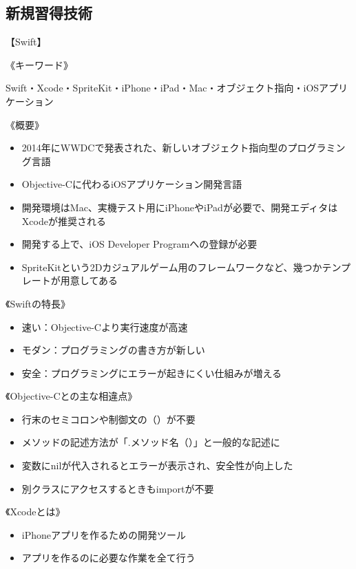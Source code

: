 \documentclass[openany,11pt,papersize]{jsbook}
\begin{document}
\begin{appendix}

\chapter{新規習得技術}
\par【Swift】
\par《キーワード》
\par Swift・Xcode・SpriteKit・iPhone・iPad・Mac・オブジェクト指向・iOSアプリケーション
\par《概要》
\begin{itemize}
\item 2014年にWWDCで発表された、新しいオブジェクト指向型のプログラミング言語
\item Objective-Cに代わるiOSアプリケーション開発言語
\item 開発環境はMac、実機テスト用にiPhoneやiPadが必要で、開発エディタはXcodeが推奨される
\item 開発する上で、iOS Developer Programへの登録が必要
\item SpriteKitという2Dカジュアルゲーム用のフレームワークなど、幾つかテンプレートが用意してある
\end{itemize}
\par《Swiftの特長》
\begin{itemize}
\item 速い：Objective-Cより実行速度が高速
\item モダン：プログラミングの書き方が新しい
\item 安全：プログラミングにエラーが起きにくい仕組みが増える
\end{itemize}
\par《Objective-Cとの主な相違点》
\begin{itemize}
\item 行末のセミコロンや制御文の（）が不要
\item メソッドの記述方法が「.メソッド名（）」と一般的な記述に
\item 変数にnilが代入されるとエラーが表示され、安全性が向上した
\item 別クラスにアクセスするときもimportが不要
\end{itemize}
\par《Xcodeとは》
\begin{itemize}
\item iPhoneアプリを作るための開発ツール
\item アプリを作るのに必要な作業を全て行う
\end{itemize}

\end{appendix}
\end{document}

